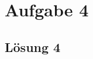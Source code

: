 \documentclass[main.tex]{subfiles}
\begin{document}
\section{Aufgabe 4}

\subsection{Lösung 4}
\end{document}
